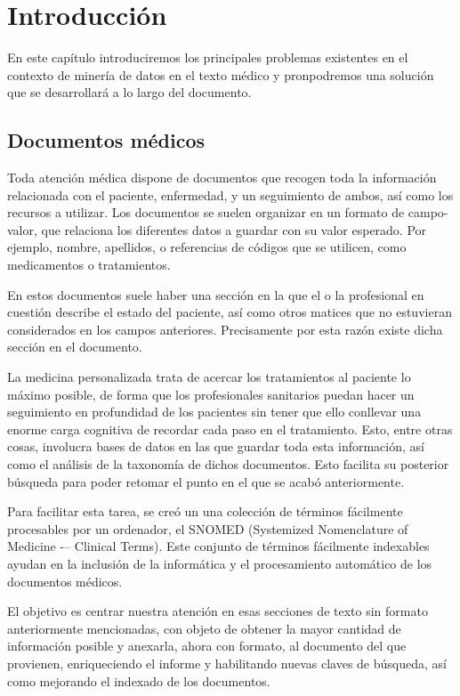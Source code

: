 \chapter{Introducción}

En este capítulo introduciremos los principales problemas existentes en el contexto de minería de datos en el texto médico y pronpodremos una solución que se desarrollará a lo largo del documento.

\section{Documentos médicos}

Toda atención médica dispone de documentos que recogen toda la información relacionada con el paciente, enfermedad, y un seguimiento de ambos, así como los recursos a utilizar. Los documentos se suelen organizar en un formato de campo-valor, que relaciona los diferentes datos a guardar con su valor esperado. Por ejemplo, nombre, apellidos, o referencias de códigos que se utilicen, como medicamentos o tratamientos.

En estos documentos suele haber una sección en la que el o la profesional en cuestión describe el estado del paciente, así como otros matices que no estuvieran considerados en los campos anteriores. Precisamente por esta razón existe dicha sección en el documento.

La medicina personalizada trata de acercar los tratamientos al paciente lo máximo posible, de forma que los profesionales sanitarios puedan hacer un seguimiento en profundidad de los pacientes sin tener que ello conllevar una enorme carga cognitiva de recordar cada paso en el tratamiento. Esto, entre otras cosas, involucra bases de datos en las que guardar toda esta información, así como el análisis de la taxonomía de dichos documentos. Esto facilita su posterior búsqueda para poder retomar el punto en el que se acabó anteriormente.

Para facilitar esta tarea, se creó un una colección de términos fácilmente procesables por un ordenador, el SNOMED (Systemized Nomenclature of Medicine -– Clinical Terms). Este conjunto de términos fácilmente indexables ayudan en la inclusión de la informática y el procesamiento automático de los documentos médicos.

El objetivo es centrar nuestra atención en esas secciones de texto sin formato anteriormente mencionadas, con objeto de obtener la mayor cantidad de información posible y anexarla, ahora con formato, al documento del que provienen, enriqueciendo el informe y habilitando nuevas claves de búsqueda, así como mejorando el indexado de los documentos.


